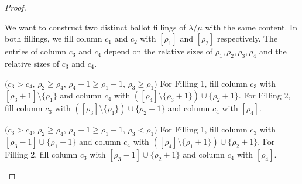 \begin{proof}
\begin{figure}[htb]
\begin{subfigure}{0.24\textwidth}
 \caption{}
 \end{subfigure}
 \begin{subfigure}{0.24\textwidth}
 \hspace{0.75cm}
 \caption{}
		\label{Figure2d}
 \end{subfigure}
 \caption{}
 \label{only4col} 
\end{figure}

We want to construct two distinct ballot fillings of $\lambda/\mu$ with the same content. In both fillings, we fill column $c_1$ and $c_2$ with $[\rho_1]$ and $[\rho_2]$ respectively. The entries of column $c_3$ and $c_4$ depend on the relative sizes of $\rho_1,\rho_2,\rho_3,\rho_4$ and the relative sizes of $c_3$ and $c_4$.


\begin{Case}
{ $(c_3 > c_4$, $\rho_2\geq \rho_4$, $\rho_4-1\geq \rho_1+1$, $\rho_3\geq \rho_1)$} 
For Filling 1, fill column $c_3$ with $[\rho_3+1]\setminus \{\rho_1\}$ and column $c_4$ with $([\rho_4]\setminus\{\rho_3+1\})\cup\{\rho_2+1\}$.
For Filling 2, fill column $c_3$ with $([\rho_3]\setminus \{\rho_1\})\cup \{\rho_2+1\}$ and column $c_4$ with $[\rho_4]$.
\end{Case}

\begin{Case}
{ $(c_3 > c_4$, $\rho_2\geq \rho_4$, $\rho_4-1\geq \rho_1+1$, $\rho_3< \rho_1)$} 
For Filling 1, fill column $c_3$ with $[\rho_3-1]\cup \{\rho_1 + 1\}$ and column $c_4$ with $([\rho_4]\setminus\{\rho_1+1\})\cup\{\rho_2+1\}$.
For Filling 2, fill column $c_3$ with $[\rho_3-1]\cup \{\rho_2+1\}$ and column $c_4$ with $[\rho_4]$.
\end{Case}


\end{proof}
